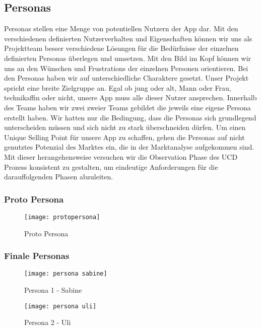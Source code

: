 \subsection{Personas}

Personas stellen eine Menge von potentiellen Nutzern der App dar. Mit den verschiedenen definierten Nutzerverhalten und Eigenschaften können wir uns als Projektteam besser verschiedene Lösungen für die Bedürfnisse der einzelnen definierten Personas überlegen und umsetzen. Mit den Bild im Kopf können wir uns an den Wünschen und Frustrations der einzelnen Personen orientieren. Bei den Personas haben wir auf unterschiedliche Charaktere gesetzt. Unser Projekt spricht eine breite Zielgruppe an. Egal ob jung oder alt, Mann oder Frau, technikaffin oder nicht, unsere App muss alle dieser Nutzer ansprechen. Innerhalb des Teams haben wir zwei zweier Teams gebildet die jeweils eine eigene Persona erstellt haben. Wir hatten nur die Bedingung, dass die Personas sich grundlegend unterscheiden müssen und sich nicht zu stark überschneiden dürfen. Um einen Unique Selling Point für unsere App zu schaffen, gehen die Personas auf nicht genutztes Potenzial des Marktes ein, die in der Marktanalyse aufgekommen sind. Mit dieser herangehensweise versuchen wir die Observation Phase des UCD Prozess konsistent zu gestalten, um eindeutige Anforderungen für die darauffolgenden Phasen abzuleiten.

\clearpage

\subsubsection{Proto Persona}

\begin{figure}[h]
  \centering
  \texttt{[image: protopersona]}
  \caption{Proto Persona}
  \label{fig:protopersona}
\end{figure}

\clearpage

\subsubsection{Finale Personas}

\begin{figure}[H]
  \centering
  \texttt{[image: persona sabine]}
  \caption{Persona 1 - Sabine}
  \label{fig:persona-sabine}
\end{figure}

\clearpage

\begin{figure}[H]
  \centering
  \texttt{[image: persona uli]}
  \caption{Persona 2 - Uli}
  \label{fig:persona-uli}
\end{figure}
